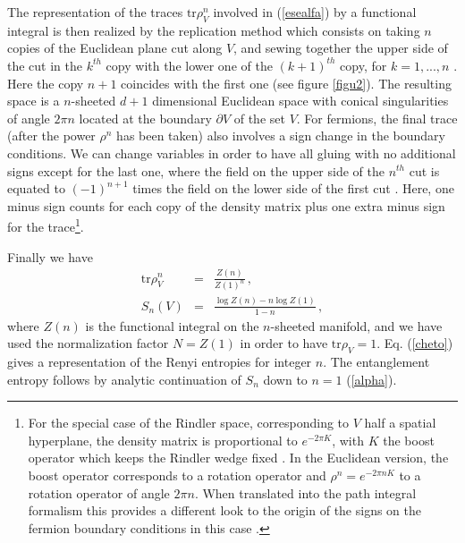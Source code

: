\documentclass[11pt]{article}
\begin{document}
The representation of the traces $\textrm{tr}\rho_V^n$ involved in (\ref{esealfa}) by a functional integral is then realized by the replication method which consists on taking $n$ copies of the Euclidean plane cut along $V$, and sewing together the upper side of the cut in the $k^{th}$ copy with
the lower one of the $(k+1)^{th}$ copy, for $ k=1,...,n$ \cite{cw,cc}. Here the copy $n+1$ coincides with the first one (see figure \ref{figu2}). The resulting space is a $n$-sheeted $d+1$ dimensional Euclidean space with conical singularities of angle $2\pi n$ located at the boundary $\partial V$ of the set $V$. For fermions, the final trace (after the power $\rho^n$ has been taken) also involves a sign change in the boundary conditions. We can change variables in order to have all gluing with no additional signs except for the last one, where the field on the upper side of the $n^{th}$ cut is equated to $(-1)^{n+1}$ times the field on the lower side of the first cut \cite{fermion}. Here, one minus sign counts for each copy of the density matrix plus one extra minus sign for the trace\footnote{For the special case of the Rindler space, corresponding to $V$ half a spatial hyperplane, the density matrix is proportional to $e^{-2\pi K}$, with $K$ the boost operator which keeps the Rindler wedge fixed \cite{boostwedge}. In the Euclidean version, the boost operator corresponds to a rotation operator and  $\rho^n=e^{-2\pi n K}$ to a rotation operator of angle $2 \pi n$. When translated into the path integral formalism this provides a different look to the origin of the signs on the fermion boundary conditions in this case \cite{Kabat}.}. 

Finally we have  
\begin{eqnarray}
\textrm{tr}\rho_V^{n}&=& \frac{Z(n)}{Z(1)^{n}}\,,\\
S_n(V)&=& \frac{\log Z(n)-n \log Z(1)}{1-n}\label{cheto}\,,
\label{dd}
\end{eqnarray}
where $Z(n)$ is the functional integral on the $n$-sheeted manifold, and we have used the normalization factor $N=Z(1)$ in order to have $\textrm{tr} \rho_V=1$. 
Eq. (\ref{cheto}) gives a representation of the Renyi entropies for integer $n$. The entanglement entropy follows by analytic continuation of $S_n$ down to $n=1$ (\ref{alpha}).
\end{document}

